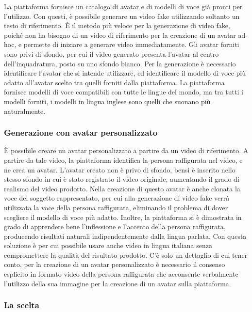 La piattaforma fornisce un catalogo di avatar e di modelli di voce già pronti per l'utilizzo. Con questi, è possibile generare un video fake utilizzando soltanto un testo di riferimento. È il metodo più veloce per la generazione di video fake, poiché non ha bisogno di un video di riferimento per la creazione di un avatar ad-hoc, e permette di iniziare a generare video immediatamente. Gli avatar forniti sono privi di sfondo, per cui il video generato presenta l'avatar al centro dell'inquadratura, posto su uno sfondo bianco. Per la generazione è necessario identificare l'avatar che si intende utilizzare, ed identificare il modello di voce più adatto all'avatar scelto tra quelli forniti dalla piattaforma. La piattaforma fornisce modelli di voce compatibili con tutte le lingue del mondo, ma tra tutti i modelli forniti, i modelli in lingua inglese sono quelli che suonano più naturalmente.

\subsubsection{Generazione con avatar personalizzato}

È possibile creare un avatar personalizzato a partire da un video di riferimento. A partire da tale video, la piattaforma identifica la persona raffigurata nel video, e ne crea un avatar. L'avatar creato non è privo di sfondo, bensì è inserito nello stesso sfondo in cui è stato registrato il video originale, aumentando il grado di realismo del video prodotto. Nella creazione di questo avatar è anche clonata la voce del soggetto rappresentato, per cui alla generazione di video fake verrà utilizzata la voce della persona raffigurata, eliminando il problema di dover scegliere il modello di voce più adatto. Inoltre, la piattaforma si è dimostrata in grado di apprendere bene l'inflessione e l'accento della persona raffigurata, producendo risultati naturali indipendentemente dalla lingua parlata. Con questa soluzione è per cui possibile usare anche video in lingua italiana senza compromettere la qualità del risultato prodotto. C'è solo un dettaglio di cui tener conto, per la creazione di un avatar personalizzato è necessario il consenso esplicito in formato video della persona raffigurata che acconsente verbalmente  l'utilizzo della sua immagine per la creazione di un avatar sulla piattaforma.

\subsubsection{La scelta}


